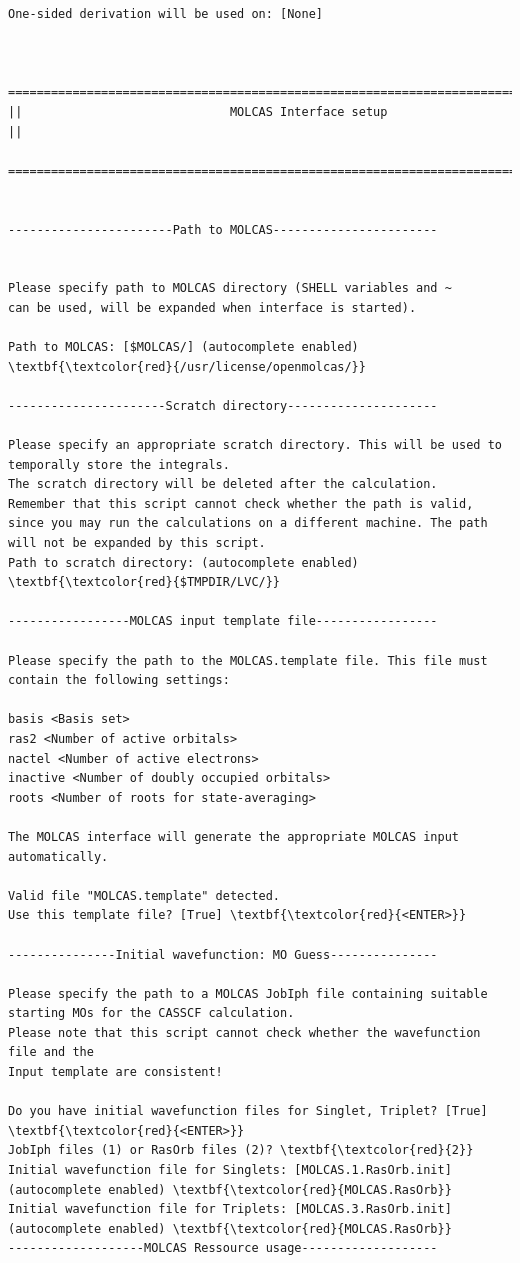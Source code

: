 \documentclass[a4paper,11pt,DIV=15,openany]{scrbook}
\begin{document}
\begin{oframed}
\begin{Verbatim}[commandchars=\\\{\}]
One-sided derivation will be used on: [None]


  ================================================================================
||                             MOLCAS Interface setup                             ||
  ================================================================================


-----------------------Path to MOLCAS-----------------------


Please specify path to MOLCAS directory (SHELL variables and ~ 
can be used, will be expanded when interface is started).

Path to MOLCAS: [$MOLCAS/] (autocomplete enabled) \textbf{\textcolor{red}{/usr/license/openmolcas/}}

----------------------Scratch directory---------------------

Please specify an appropriate scratch directory. This will be used to temporally store the integrals. 
The scratch directory will be deleted after the calculation. 
Remember that this script cannot check whether the path is valid, 
since you may run the calculations on a different machine. The path will not be expanded by this script.
Path to scratch directory: (autocomplete enabled) \textbf{\textcolor{red}{$TMPDIR/LVC/}}

-----------------MOLCAS input template file-----------------

Please specify the path to the MOLCAS.template file. This file must contain the following settings:

basis <Basis set>
ras2 <Number of active orbitals>
nactel <Number of active electrons>
inactive <Number of doubly occupied orbitals>
roots <Number of roots for state-averaging>

The MOLCAS interface will generate the appropriate MOLCAS input automatically.

Valid file "MOLCAS.template" detected. 
Use this template file? [True] \textbf{\textcolor{red}{<ENTER>}}

---------------Initial wavefunction: MO Guess---------------

Please specify the path to a MOLCAS JobIph file containing suitable starting MOs for the CASSCF calculation. 
Please note that this script cannot check whether the wavefunction file and the 
Input template are consistent!

Do you have initial wavefunction files for Singlet, Triplet? [True] \textbf{\textcolor{red}{<ENTER>}}
JobIph files (1) or RasOrb files (2)? \textbf{\textcolor{red}{2}}
Initial wavefunction file for Singlets: [MOLCAS.1.RasOrb.init] (autocomplete enabled) \textbf{\textcolor{red}{MOLCAS.RasOrb}}
Initial wavefunction file for Triplets: [MOLCAS.3.RasOrb.init] (autocomplete enabled) \textbf{\textcolor{red}{MOLCAS.RasOrb}}
-------------------MOLCAS Ressource usage-------------------


\end{Verbatim}
\end{oframed}
\end{document}

